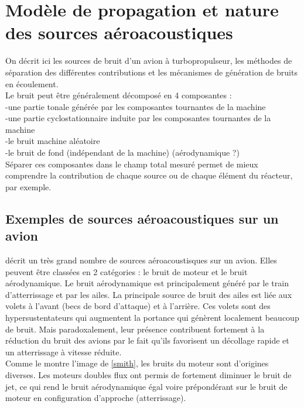 \section{Modèle de propagation et nature des sources aéroacoustiques}
On décrit ici les sources de bruit d'un avion à turbopropulseur, les méthodes de séparation des différentes contributions et les mécanismes de génération de bruits en écoulement.\\


Le bruit peut être généralement décomposé en 4 composantes : \\
-une partie tonale générée par les composantes tournantes de la machine\\
-une partie cyclostationnaire induite par les composantes tournantes de la machine\\
-le bruit machine aléatoire \\
-le bruit de fond (indépendant de la machine) (aérodynamique ?)\\


Séparer ces composantes dans le champ total mesuré permet de mieux comprendre la contribution de chaque source ou de chaque élément du réacteur, par exemple.



\subsection{Exemples de sources aéroacoustiques sur un avion}

\cite{Smith1989} décrit un très grand nombre de sources aéroacoustisques sur un avion. Elles peuvent être classées en 2 catégories : le bruit de moteur et le bruit aérodynamique. Le bruit aérodynamique est principalement généré par le train d'atterrissage et par les ailes. La principale source de bruit des ailes est liée aux volets à l'avant (becs de bord d'attaque) et à l'arrière. Ces volets sont des hypersustentateurs qui augmentent la portance qui génèrent localement beaucoup de bruit. Mais paradoxalement, leur présence contribuent fortement à la réduction du bruit des avions par le fait qu'ils favorisent un décollage rapide et un atterrissage à vitesse réduite.\\
Comme le montre l'image de \cite{Smith1989} \ref{smith}, les bruits du moteur sont d'origines diverses. Les moteurs doubles flux ont permis de fortement diminuer le bruit de jet, ce qui rend le bruit aérodynamique égal voire prépondérant sur le bruit de moteur en configuration d'approche (atterrissage).

